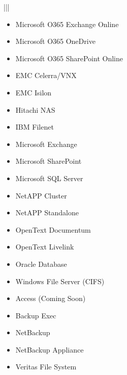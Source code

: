 \documentclass[letterpaper,10pt,english]{sphinxhowto}
\begin{document}
\begin{savenotes}
\begin{longtable}{|||}
\begin{itemize}
\item {} 
Microsoft O365 Exchange Online

\item {} 
Microsoft O365 OneDrive

\item {} 
Microsoft O365 SharePoint Online

\end{itemize}

\begin{itemize}
\item {} 
EMC Celerra/VNX

\item {} 
EMC Isilon

\item {} 
Hitachi NAS

\item {} 
IBM Filenet

\item {} 
Microsoft Exchange

\item {} 
Microsoft SharePoint

\item {} 
Microsoft SQL Server

\item {} 
NetAPP Cluster

\item {} 
NetAPP Standalone

\item {} 
OpenText Documentum

\item {} 
OpenText Livelink

\item {} 
Oracle Database

\item {} 
Windows File Server (CIFS)

\end{itemize}

\begin{itemize}
\item {} 
Access (Coming Soon)

\item {} 
Backup Exec

\item {} 
NetBackup

\item {} 
NetBackup Appliance

\item {} 
Veritas File System


\end{itemize}
\end{longtable}
\end{savenotes}
\end{document}
